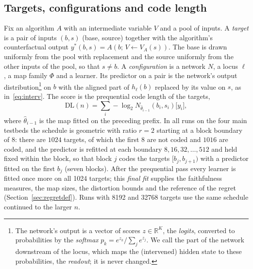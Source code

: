 \documentclass[11pt,a4paper]{article}
\newcommand{\DL}{\mathrm{DL}}
\begin{document}
\subsection{Targets, configurations and code length}
\label{sec:score:def}

Fix an algorithm $A$ with an intermediate variable $V$ and a pool of inputs. A \emph{target} is a pair of inputs $(b,s)$ (base, source) together with the algorithm's counterfactual output $y^*(b,s)=A(b;\,V\leftarrow V_A(s))$. The base is drawn uniformly from the pool with replacement and the source uniformly from the other inputs of the pool, so that $s\ne b$. A \emph{configuration} is a network $N$, a locus $\ell$, a map family $\Phi$ and a learner. Its predictor on a pair is the network's output distribution\footnote{The network's output is a vector of scores $z\in\mathbb R^K$, the \emph{logits}, converted to probabilities by the \emph{softmax} $p_k=e^{z_k}/\sum_je^{z_j}$. We call the part of the network downstream of the locus, which maps the (intervened) hidden state to these probabilities, the \emph{readout}; it is never changed.} on $b$ with the aligned part of $h_\ell(b)$ replaced by its value on $s$, as in~\eqref{eq:interv}. The score is the prequential code length of the targets,
\begin{equation}
\DL(n)=\sum_{i} -\log_2 N_{\hat\theta_{i-1}}(b_i,s_i)\bigl[y_i\bigr],
\label{eq:dl}
\end{equation}
where $\hat\theta_{i-1}$ is the map fitted on the preceding prefix. In all runs on the four main testbeds the schedule is geometric with ratio $r=2$ starting at a block boundary of 8: there are $1024$ targets, of which the first 8 are not coded and $1016$ are coded, and the predictor is refitted at each boundary $8,16,32,\dots,512$ and held fixed within the block, so that block $j$ codes the targets $[b_j,b_{j+1})$ with a predictor fitted on the first $b_j$ (seven blocks). After the prequential pass every learner is fitted once more on all 1024 targets; this \emph{final fit} supplies the faithfulness measures, the map sizes, the distortion bounds and the reference of the regret (Section~\ref{sec:regretdef}). Runs with 8192 and 32768 targets use the same schedule continued to the larger $n$.
\end{document}
